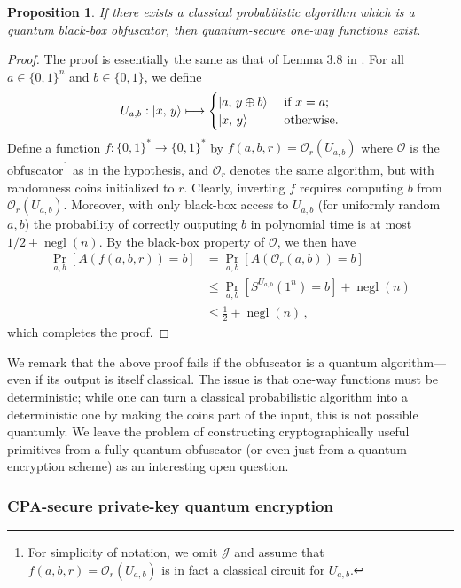 \documentclass[11pt]{article}
\numberwithin{equation}{section}
\newtheorem{prop}{Proposition}
\newcommand{\opn}{\operatorname}
\newcommand{\algo}{\mathcal}
\newcommand{\negl}{\opn{negl}}
\newcommand{\prob}{\opn{Pr}}
\begin{document}
{\begin{prop}
If there exists a classical probabilistic algorithm which is a quantum black-box obfuscator, then quantum-secure one-way functions exist.
\end{prop}
\begin{proof}
The proof is essentially the same as that of Lemma 3.8 in \cite{BGIRSVY12}. For all $a \in \{0, 1\}^n$ and $b \in \{0, 1\}$, we define 
$$
U_{a, b} : {\left\vert{x,\, y}\right\rangle} \longmapsto
\begin{cases}
{\left\vert{a,\, y \oplus b}\right\rangle} &\text{ if } x = a;\\
{\left\vert{x,\, y}\right\rangle} &\text{ otherwise}.
\end{cases}
$$
Define a function $f : \{0, 1\}^* \rightarrow \{0, 1\}^*$ by $f(a, b, r) = \algo O_r(U_{a, b})$ where $\algo O$ is the obfuscator\footnote{For simplicity of notation, we omit $\algo J$ and assume that $f(a, b, r) = \algo O_r(U_{a, b})$ is in fact a classical circuit for $U_{a, b}$.} as in the hypothesis, and $\algo O_r$ denotes the same algorithm, but with randomness coins initialized to $r$. Clearly, inverting $f$ requires computing $b$ from $\algo O_r(U_{a, b})$. Moreover, with only black-box access to $U_{a, b}$ (for uniformly random $a, b$) the probability of correctly outputing $b$ in polynomial time is at most $1/2 + \negl(n)$.  By the black-box property of $\mathcal O$, we then have
\begin{align*}
\prob_{a, b} [ A(f(a, b, r)) = b] 
&= \prob_{a, b} [ A(\mathcal O_r(a, b)) = b ]\\
&\leq \prob_{a, b} \left[ S^{U_{a, b}}(1^n) = b\right] + \negl(n)\\
&\leq \frac{1}{2} + \negl(n)\,,
\end{align*}
which completes the proof.
\end{proof}

We remark that the above proof fails if the obfuscator is a quantum algorithm---even if its output is itself classical. The issue is that one-way functions must be deterministic; while one can turn a classical probabilistic algorithm into a deterministic one by making the coins part of the input, this is not possible quantumly. We leave the problem of constructing cryptographically useful primitives from a fully quantum obfuscator (or even just from a quantum encryption scheme) as an interesting open question. 

\subsubsection{CPA-secure private-key quantum encryption}

}
\end{document}
